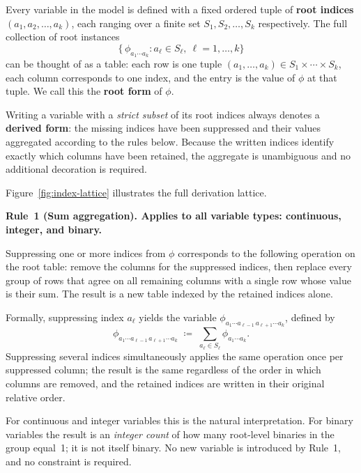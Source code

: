 \begin{convention}
\label{conv:notation}

Every variable in the model is defined with a fixed ordered tuple of
\textbf{root indices} $(a_1, a_2, \dots, a_k)$, each ranging over a
finite set $S_1, S_2, \dots, S_k$ respectively.
The full collection of root instances
\[
  \bigl\{\,\phi_{a_1 \cdots a_k} : a_\ell \in S_\ell,\ \ell = 1,\dots,k\bigr\}
\]
can be thought of as a table: each row is one tuple
$(a_1,\dots,a_k)\in S_1\times\cdots\times S_k$, each column
corresponds to one index, and the entry is the value of $\phi$ at
that tuple.
We call this the \textbf{root form} of $\phi$.

Writing a variable with a \emph{strict subset} of its root indices
always denotes a \textbf{derived form}: the missing indices have been
suppressed and their values aggregated according to the rules below.
Because the written indices identify exactly which columns have been
retained, the aggregate is unambiguous and no additional decoration
is required.

Figure~\ref{fig:index-lattice} illustrates the full derivation lattice.

\medskip
\noindent\textbf{Rule~1 (Sum aggregation).
  Applies to all variable types: continuous, integer, and binary.}

Suppressing one or more indices from $\phi$ corresponds to the
following operation on the root table: remove the columns for the
suppressed indices, then replace every group of rows that agree on
all remaining columns with a single row whose value is their sum.
The result is a new table indexed by the retained indices alone.

Formally, suppressing index $a_\ell$ yields the variable
$\phi_{a_1 \cdots a_{\ell-1}\, a_{\ell+1} \cdots a_k}$, defined by
%
\begin{equation*}
  \phi_{a_1 \cdots a_{\ell-1}\, a_{\ell+1} \cdots a_k}
  \;\coloneqq\;
  \sum_{a_\ell \in S_\ell}
  \phi_{a_1 \cdots a_k}.
\end{equation*}
%
Suppressing several indices simultaneously applies the same
operation once per suppressed column; the result is the same
regardless of the order in which columns are removed, and the
retained indices are written in their original relative order.

For continuous and integer variables this is the natural
interpretation.
For binary variables the result is an \emph{integer count} of how
many root-level binaries in the group equal~1; it is not itself
binary.
No new variable is introduced by Rule~1, and no constraint is
required.


\end{convention}
